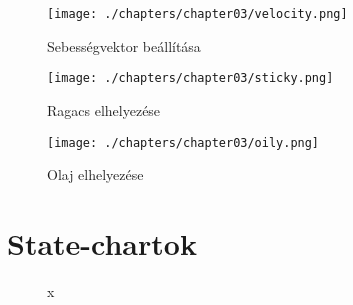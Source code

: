 \begin{figure}[!htbp]
\begin{center}
	\texttt{[image: ./chapters/chapter03/velocity.png]}
	\caption{Sebességvektor beállítása}
\end{center}
\end{figure}

\clearpage

\begin{figure}[!htbp]
	\begin{center}
		\texttt{[image: ./chapters/chapter03/sticky.png]}
		\caption{Ragacs elhelyezése}
	\end{center}
\end{figure}

\begin{figure}[!htbp]
	\begin{center}
		\texttt{[image: ./chapters/chapter03/oily.png]}
		\caption{Olaj elhelyezése}
	\end{center}
\end{figure}



\section{State-chartok}

\begin{figure}[h]
\begin{center}
\caption{x}
\label{fig:example3}
\end{center}
\end{figure}

